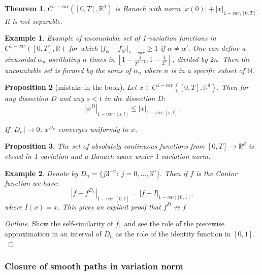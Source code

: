 \documentclass{article}
\newcommand{\R}{\mathbb{R}}
\newtheorem{theorem}{Theorem}
\newtheorem{prop}[theorem]{Proposition}
\newtheorem{example}{Example}
\begin{document}
\begin{theorem}
    $C^{1-var}([0,T], \R^d)$ is Banach with norm $|x(0)| + |x|_{1-var, [0,T]}.$ It is not separable.
\end{theorem}

\begin{example}
    Example of uncountable set of 1-variation functions in $C^{1-var}([0,T], \R)$ for which $|f_\alpha - f_{\alpha'}|_{1-var} \geq 1$ if $\alpha \neq \alpha'.$
    One can define a sinusoidal $\alpha_n$ oscillating $n$ times in $[1-\frac{1}{2^{n-1}}, 1 - \frac{1}{2^n}]$, divided by $2n.$ 
    Then the uncountable set is formed by the sums of $\alpha_n$ where $n$ is in a specific subset of $\mathbb{N}.$
\end{example}

\begin{prop}[mistake in the book]
    Let $x \in C^{1-var}([0,T], \R^d).$ Then for any dissection $D$ and any $s < t$ in the dissection $D:$
    \begin{equation}
        |x^D|_{1-var; [s,t]} \leq |x|_{1-var; [s,t]}.
    \end{equation}

    If $|D_n| \rightarrow 0$, $x^{D_n}$ converges uniformly to $x$.
\end{prop}

\begin{prop}
    The set of absolutely continuous functions from $[0,T] \rightarrow \R^d$ is closed in 1-variation and a Banach space under 1-variation norm.
\end{prop}

\begin{example}
    Denote by $D_n = \{ j 3^{-n}:\ j = 0, \ldots, 3^n \}.$ Then if $f$ is the Cantor function we have:
    \begin{equation}
        |f - f^{D_n}|_{1-var; [0,1]} = |f - I|_{1-var; [0,1]},
    \end{equation}
    where $I(x)=x.$ This gives an explicit proof that $f^D \not \rightarrow f$
\end{example}
\begin{proof}[Outline]
    Show the self-similarity of $f,$ and see the role of the piecewise approximation in an interval of $D_n$ as the role of the identity function in $[0,1].$
\end{proof}

\subsubsection{Closure of smooth paths in variation norm}
\end{document}
